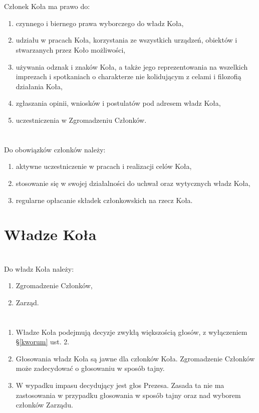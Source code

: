 \documentclass[a4paper]{article}
\begin{document}
\section{}
Członek Koła ma prawo do:
\begin{enumerate}[label=\alph*)]
\item czynnego i biernego prawa wyborczego do władz Koła,
\item udziału w pracach Koła, korzystania ze wszystkich urządzeń, obiektów i stwarzanych przez Koło możliwości,
\item używania odznak i znaków Koła, a także jego reprezentowania na wszelkich imprezach i spotkaniach o charakterze nie kolidującym z celami i filozofią działania Koła,
\item zgłaszania opinii, wniosków i postulatów pod adresem władz Koła,
\item uczestniczenia w Zgromadzeniu Członków.
\end{enumerate}

\section{}
Do obowiązków członków należy:
\begin{enumerate}[label=\alph*)]
\item aktywne uczestniczenie w pracach i realizacji celów Koła,
\item stosowanie się w swojej działalności do uchwał oraz wytycznych władz Koła,
\item regularne opłacanie składek członkowskich na rzecz Koła.
\end{enumerate}

\section*{Władze Koła~~~}
\section{}

Do władz Koła należy:
\begin{enumerate}[label=\alph*)]
\item Zgromadzenie Członków,
\item Zarząd.
\end{enumerate}

\section{}
\begin{enumerate}
\item Władze Koła podejmują decyzje zwykłą większością głosów, z wyłączeniem \S \ref{kworum} ust. 2.
\item Głosowania władz Koła są jawne dla członków Koła. Zgromadzenie Członków może zadecydować o głosowaniu w sposób tajny.
\item W wypadku impasu decydujący jest głos Prezesa. Zasada ta nie ma zastosowania w przypadku głosowania w sposób tajny oraz nad wyborem członków Zarządu.
\end{enumerate}
\end{document}
